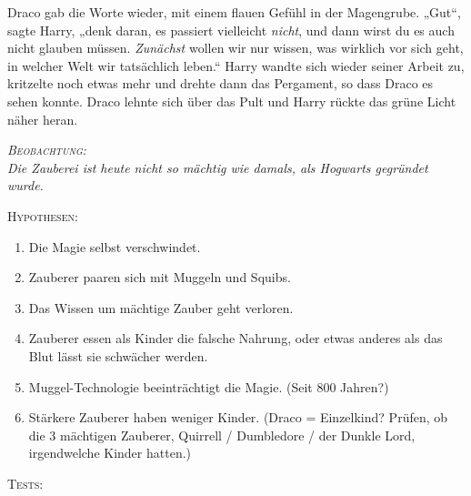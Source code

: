 Draco gab die Worte wieder, mit einem flauen Gefühl in der Magengrube.
„Gut“, sagte Harry, „denk daran, es passiert vielleicht \emph{nicht}, und dann wirst du es auch nicht glauben müssen. \emph{Zunächst} wollen wir nur wissen, was wirklich vor sich geht, in welcher Welt wir tatsächlich leben.“ Harry wandte sich wieder seiner Arbeit zu, kritzelte noch etwas mehr und drehte dann das Pergament, so dass Draco es sehen konnte. Draco lehnte sich über das Pult und Harry rückte das grüne Licht näher heran.

\begin{center}\itshape
{\scshape Beobachtung:}\\
Die Zauberei ist heute nicht so mächtig wie damals, als Hogwarts gegründet wurde.

{\scshape Hypothesen:}
\begin{enumerate}[1.]\firmlist
\item Die Magie selbst verschwindet.
\item Zauberer paaren sich mit Muggeln und Squibs.
\item Das Wissen um mächtige Zauber geht verloren.
\item Zauberer essen als Kinder die falsche Nahrung, oder etwas anderes als das Blut lässt sie schwächer werden.
\item Muggel-Technologie beeinträchtigt die Magie. (Seit 800 Jahren?)
\item Stärkere Zauberer haben weniger Kinder. (Draco = Einzelkind? Prüfen, ob die 3 mächtigen Zauberer, Quirrell / Dumbledore / der Dunkle Lord, irgendwelche Kinder hatten.)
\end{enumerate}
{\scshape Tests:}
\end{center}

